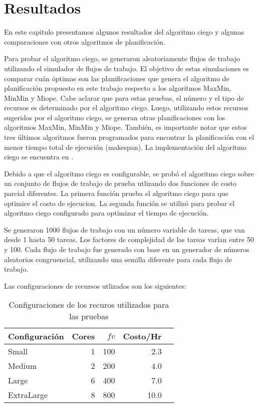 \chapter{Resultados}

En este capitulo presentamos algunos resultados del algoritmo ciego y algunas comparaciones con otros algoritmos de planificación. 

Para probar el algoritmo ciego, se generaron aleatoriamente flujos de trabajo utilizando el simulador de flujos de trabajo. El objetivo de estas simulaciones es comparar cuán óptimas son las planificaciones que genera el algoritmo de planificación propuesto en este trabajo respecto a los algoritmos MaxMin, MinMin y Miope. Cabe aclarar que para estas pruebas, el número y el tipo de recursos es determinado por el algoritmo ciego. Luego, utilizando estos recursos sugeridos por el algoritmo ciego, se generan otras planificaciones con los algoritmos MaxMin, MinMin y Miope. También, es importante notar que estos tres \'ultimos algoritmos fueron programados para encontrar la planificación con el menor tiempo total de ejecución (makespan). La implementaci\'on del algoritmo ciego se encuentra en \cite{dominofire2014workflowsimulator}.

Debido a que el algoritmo ciego es configurable, se prob\'o el algoritmo ciego sobre un conjunto de flujos de trabajo de prueba utlizando dos funciones de costo parcial diferentes. La primera funci\'on prueba el algoritmo ciego para que optimice el costo de ejecucion. La segunda funci\'on se utiliz\'o para probar el algoritmo ciego configurado para optimizar el tiempo de ejecuci\'on.

Se generaron 1000 flujos de trabajo con un número variable de tareas, que van desde 1 hasta 50 tareas. Los factores de complejidad de las tareas varían entre 50 y 100. Cada flujo de trabajo fue generado con base en un generador de números aleatorios congruencial, utilizando una semilla diferente para cada flujo de trabajo.

Las configuraciones de recursos utlizados son los siguientes:

\begin{table}[ht]
\centering
\begin{tabular}{lrrrr}
  \hline
Configuraci\'on & Cores & $fv$ & Costo/Hr \\ 
  \hline
  Small & 1 & 100 & 2.3 \\ 
  Medium & 2 & 200 & 4.0 \\ 
  Large & 6 & 400 & 7.0 \\ 
  ExtraLarge & 8 & 800 & 10.0 \\ 
   \hline
\end{tabular}
\caption{Configuraciones de los recuros utilizados para las pruebas} 
\label{table:resource_configurations}
\end{table}

